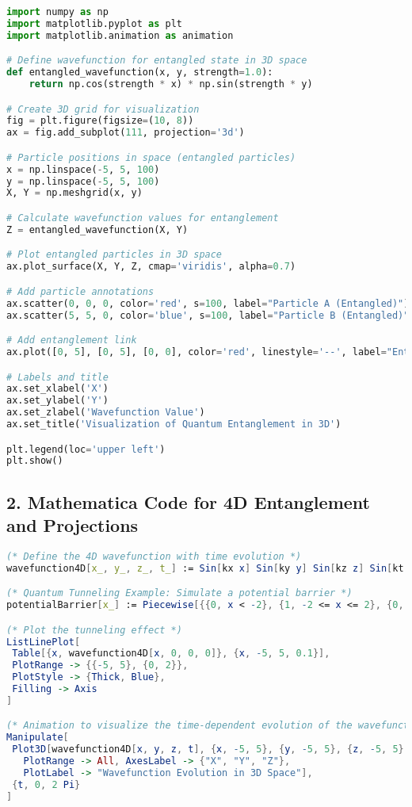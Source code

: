 \documentclass[12pt]{article}
\begin{document}
\begin{lstlisting}[language=Python, caption={Python Code: Enhanced Quantum Entanglement Visualization in 3D}]
import numpy as np
import matplotlib.pyplot as plt
import matplotlib.animation as animation

# Define wavefunction for entangled state in 3D space
def entangled_wavefunction(x, y, strength=1.0):
    return np.cos(strength * x) * np.sin(strength * y)

# Create 3D grid for visualization
fig = plt.figure(figsize=(10, 8))
ax = fig.add_subplot(111, projection='3d')

# Particle positions in space (entangled particles)
x = np.linspace(-5, 5, 100)
y = np.linspace(-5, 5, 100)
X, Y = np.meshgrid(x, y)

# Calculate wavefunction values for entanglement
Z = entangled_wavefunction(X, Y)

# Plot entangled particles in 3D space
ax.plot_surface(X, Y, Z, cmap='viridis', alpha=0.7)

# Add particle annotations
ax.scatter(0, 0, 0, color='red', s=100, label="Particle A (Entangled)")
ax.scatter(5, 5, 0, color='blue', s=100, label="Particle B (Entangled)")

# Add entanglement link
ax.plot([0, 5], [0, 5], [0, 0], color='red', linestyle='--', label="Entanglement Link")

# Labels and title
ax.set_xlabel('X')
ax.set_ylabel('Y')
ax.set_zlabel('Wavefunction Value')
ax.set_title('Visualization of Quantum Entanglement in 3D')

plt.legend(loc='upper left')
plt.show()
\end{lstlisting}

\subsection*{2. Mathematica Code for 4D Entanglement and Projections}

\begin{lstlisting}[language=Mathematica, caption={Mathematica Code: Enhanced 4D Entanglement and Quantum Tunneling Simulation}]
(* Define the 4D wavefunction with time evolution *)
wavefunction4D[x_, y_, z_, t_] := Sin[kx x] Sin[ky y] Sin[kz z] Sin[kt t]

(* Quantum Tunneling Example: Simulate a potential barrier *)
potentialBarrier[x_] := Piecewise[{{0, x < -2}, {1, -2 <= x <= 2}, {0, x > 2}}]

(* Plot the tunneling effect *)
ListLinePlot[
 Table[{x, wavefunction4D[x, 0, 0, 0]}, {x, -5, 5, 0.1}], 
 PlotRange -> {{-5, 5}, {0, 2}},
 PlotStyle -> {Thick, Blue},
 Filling -> Axis
]

(* Animation to visualize the time-dependent evolution of the wavefunction *)
Manipulate[
 Plot3D[wavefunction4D[x, y, z, t], {x, -5, 5}, {y, -5, 5}, {z, -5, 5}, 
   PlotRange -> All, AxesLabel -> {"X", "Y", "Z"}, 
   PlotLabel -> "Wavefunction Evolution in 3D Space"],
 {t, 0, 2 Pi}
]
\end{lstlisting}
\end{document}

